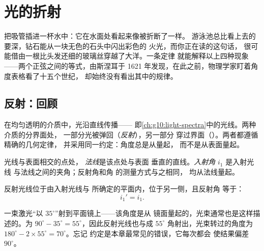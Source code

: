 \chapter{光的折射}\label{ch:g10:refraction}

把吸管插进一杯水中：它在水面处看起来像被折断了一样。
游泳池总比看上去的要深，钻石能从一块无色的石头中闪出彩色的
火光，而你正在读的这句话，
很可能借由一根比头发还细的玻璃丝穿越了大洋。一条定律
就能解释以上四种现象——两个正弦之间的等式，由斯涅耳于
1621 年发现，在此之前，物理学家盯着角度表格看了十五个世纪，
却始终没有看出其中的规律。

\section{反射：回顾}

在均匀透明的介质中，光沿直线传播——
即\cref{ch:g10:light-spectra}中的光线。两种介质的分界面处，
一部分光被弹回（\emph{反射}），另一部分
穿过界面（\emph{}）。两者都遵循精确的几何定律，
并采用同一约定：角度总是从\emph{}量起，
而不是从表面量起。

\begin{definition}[法线与入射角]\label{def:g10:refraction:angles}
光线与表面相交的点处，
\emph{法线}是该点处与表面
垂直的直线。\emph{入射角} $i_1$ 是入射光线
与法线之间的夹角；反射角和角
的测量方式与之相同，
均从法线量起。
\end{definition}

\begin{proposition}[反射定律]\label{prop:g10:refraction:reflection}
反射光线位于由入射光线与
所确定的平面内，位于另一侧，且反射角
等于：
\[
i_1' = i_1 .
\]
\end{proposition}
\admitted

\begin{example}[正确读取角度]\label{ex:g10:refraction:mirror}
一束激光“以 $35^\circ$”射到平面镜上——该角度是从
镜面量起的，光束通常也是这样描述的。为
$90^\circ - 35^\circ = 55^\circ$，因此反射光线也与成
$55^\circ$ 角射出，光束转过的角度为
$180^\circ - 2 \times 55^\circ = 70^\circ$。忘记
约定是本章最常见的错误，它每次都会
使结果偏差 $90^\circ$。
\end{example}

